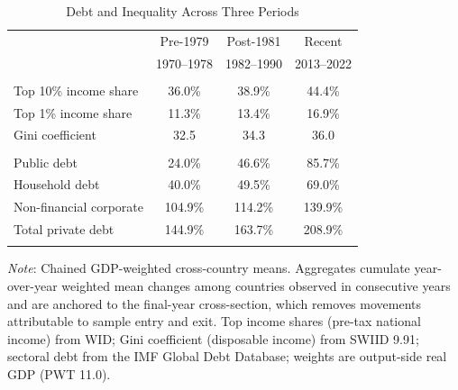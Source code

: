 \documentclass[12pt, titlepage]{article}
\numberwithin{equation}{section}
\begin{document}
\begin{table}[ht]
	\centering
	\caption{Debt and Inequality Across Three Periods}
	\label{table:descriptive}
	\begin{threeparttable}
		\begin{tabular}{lccc}
			\toprule
			& Pre-1979 & Post-1981 & Recent \\
			& 1970--1978 & 1982--1990 & 2013--2022 \\
			\midrule
			\addlinespace
			\multicolumn{4}{l}{\textit{Inequality}} \\
			\quad Top 10\% income share      & 36.0\% & 38.9\% & 44.4\% \\
			\quad Top 1\% income share       & 11.3\% & 13.4\% & 16.9\% \\
			\quad Gini coefficient           & 32.5   & 34.3   & 36.0   \\
			\addlinespace
			\multicolumn{4}{l}{\textit{Debt (share of GDP)}} \\
			\quad Public debt                & 24.0\%  & 46.6\%  & 85.7\%  \\
			\quad Household debt             & 40.0\%  & 49.5\%  & 69.0\%  \\
			\quad Non-financial corporate    & 104.9\% & 114.2\% & 139.9\% \\
			\quad Total private debt         & 144.9\% & 163.7\% & 208.9\% \\
			\addlinespace
			\bottomrule
		\end{tabular}
		\begin{tablenotes}
			\scriptsize
			\item \emph{Note}: Chained GDP-weighted cross-country means. Aggregates
			cumulate year-over-year weighted mean changes among countries observed in
			consecutive years and are anchored to the final-year cross-section, which
			removes movements attributable to sample entry and exit. Top income shares
			(pre-tax national income) from WID; Gini coefficient (disposable income)
			from SWIID 9.91; sectoral debt from the IMF Global Debt Database; weights
			are output-side real GDP (PWT 11.0).
		\end{tablenotes}
	\end{threeparttable}
\end{table}
\end{document}

